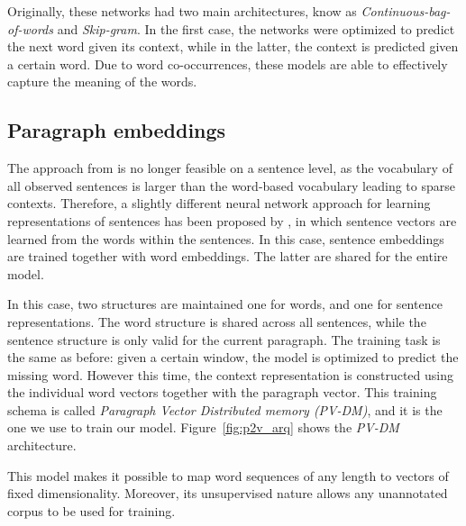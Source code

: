 Originally, these networks had two main architectures, know as \emph{Continuous-bag-of-words} and \emph{Skip-gram}. In the first case, the networks were optimized to predict the next word given its context, while in the latter, the context is predicted given a certain word. Due to word co-occurrences, these models are able to effectively capture the meaning of the words. 

\subsection{Paragraph embeddings} 
The approach from  is no longer feasible on a sentence level, as the vocabulary of all observed sentences is larger  than the word-based vocabulary leading to sparse contexts. Therefore, a slightly different neural network approach for learning representations of sentences has been proposed by , in which sentence vectors are learned from the words within the sentences. In this case, sentence embeddings are trained together with word embeddings. The latter are shared for the entire model.

In this case, two structures are maintained one for words, and one for sentence representations. The word structure is shared across all sentences, while the sentence structure is only valid for the current paragraph. The training task is the same as before: given a certain window, the model is optimized to predict the missing word. However this time, the context representation is constructed using the individual word vectors together with the paragraph vector. This training schema is called \emph{Paragraph Vector Distributed memory (PV-DM)}, and it is the one we use to train our model. Figure~\ref{fig:p2v_arq} shows the \emph{PV-DM} architecture.

This model makes it possible to map word sequences of any length to vectors of fixed dimensionality. Moreover, its unsupervised nature allows any unannotated corpus to be used for training.



